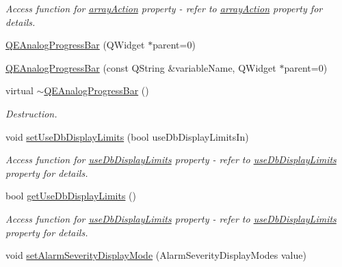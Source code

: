 \begin{DoxyCompactItemize}
\begin{DoxyCompactList}\small\item\em Access function for \hyperlink{classQEAnalogProgressBar_ac25da924e9ce550248e31d83516bf4ff}{arrayAction} property -\/ refer to \hyperlink{classQEAnalogProgressBar_ac25da924e9ce550248e31d83516bf4ff}{arrayAction} property for details. \end{DoxyCompactList}\item 
\hyperlink{classQEAnalogProgressBar_a441c8deb2bc04f3f84b2436691c7309e}{QEAnalogProgressBar} (QWidget $\ast$parent=0)
\item 
\hyperlink{classQEAnalogProgressBar_acd940bdca3abf8c654938df30fdc80bb}{QEAnalogProgressBar} (const QString \&variableName, QWidget $\ast$parent=0)
\item 
\hypertarget{classQEAnalogProgressBar_ab1ca424324c3dcbbc01ebba10901f49c}{
virtual \hyperlink{classQEAnalogProgressBar_ab1ca424324c3dcbbc01ebba10901f49c}{$\sim$QEAnalogProgressBar} ()}
\label{classQEAnalogProgressBar_ab1ca424324c3dcbbc01ebba10901f49c}

\begin{DoxyCompactList}\small\item\em Destruction. \end{DoxyCompactList}\item 
\hypertarget{classQEAnalogProgressBar_a40c213a6aa00e6d54c2e607ec8def28b}{
void \hyperlink{classQEAnalogProgressBar_a40c213a6aa00e6d54c2e607ec8def28b}{setUseDbDisplayLimits} (bool useDbDisplayLimitsIn)}
\label{classQEAnalogProgressBar_a40c213a6aa00e6d54c2e607ec8def28b}

\begin{DoxyCompactList}\small\item\em Access function for \hyperlink{classQEAnalogProgressBar_a5ce12a78667eafebc8c9d7f9924acbf7}{useDbDisplayLimits} property -\/ refer to \hyperlink{classQEAnalogProgressBar_a5ce12a78667eafebc8c9d7f9924acbf7}{useDbDisplayLimits} property for details. \end{DoxyCompactList}\item 
\hypertarget{classQEAnalogProgressBar_af4ca084706ea4ed21b1ca93712d3fc0f}{
bool \hyperlink{classQEAnalogProgressBar_af4ca084706ea4ed21b1ca93712d3fc0f}{getUseDbDisplayLimits} ()}
\label{classQEAnalogProgressBar_af4ca084706ea4ed21b1ca93712d3fc0f}

\begin{DoxyCompactList}\small\item\em Access function for \hyperlink{classQEAnalogProgressBar_a5ce12a78667eafebc8c9d7f9924acbf7}{useDbDisplayLimits} property -\/ refer to \hyperlink{classQEAnalogProgressBar_a5ce12a78667eafebc8c9d7f9924acbf7}{useDbDisplayLimits} property for details. \end{DoxyCompactList}\item 
\hypertarget{classQEAnalogProgressBar_a5cb8b4fe253dbac7042029e169513486}{
void \hyperlink{classQEAnalogProgressBar_a5cb8b4fe253dbac7042029e169513486}{setAlarmSeverityDisplayMode} (AlarmSeverityDisplayModes value)}
\label{classQEAnalogProgressBar_a5cb8b4fe253dbac7042029e169513486}


\end{DoxyCompactItemize}
